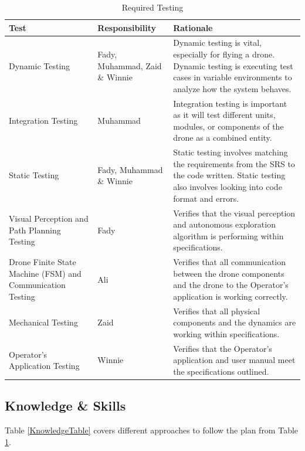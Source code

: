 \documentclass[12pt, titlepage]{article}
\begin{document}
  
\begin{table}[!h]
\begin{center}
\caption {Required Testing}
\label{RequiredTesting}
\begin{tabular}{ | m{3cm} | m{3cm} | m{8cm} | }
\hline
Test & Responsibility & Rationale\\
\hline
Dynamic Testing & Fady, Muhammad, Zaid \& Winnie & Dynamic testing is vital, especially for flying a drone. Dynamic testing is executing test cases in variable environments to analyze how the system behaves.\\
\hline
Integration Testing & Muhammad & Integration testing is important as it will test different units, modules, or components of the drone as a combined entity.\\
\hline
Static Testing & Fady, Muhammad \& Winnie & Static testing involves matching the requirements from the SRS to the code written. Static testing also involves looking into code format and errors. \\
\hline
 Visual Perception and Path Planning Testing & Fady & Verifies that the visual perception and autonomous exploration algorithm is performing within specifications. \\
\hline
Drone Finite State Machine (FSM) and Communication Testing & Ali & Verifies that all communication between the drone components and the drone to the Operator's application is working correctly. \\
\hline
Mechanical Testing & Zaid & Verifies that all physical components and the dynamics are working within specifications. \\
\hline
Operator's Application Testing & Winnie & Verifies that the Operator's application and user manual meet the specifications outlined.
\\
\hline
\end{tabular}
\end{center}
\end{table}

\subsection{Knowledge & Skills}
Table \ref{KnowledgeTable} covers different approaches to follow the plan from Table \ref{RequiredTesting}.
\end{document}
